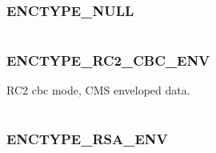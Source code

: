 \documentclass[letterpaper,10pt,english]{sphinxmanual}
\begin{document}
\subsubsection{ENCTYPE\_NULL}
\label{appdev/refs/macros/ENCTYPE_NULL:enctype-null}\label{appdev/refs/macros/ENCTYPE_NULL::doc}\label{appdev/refs/macros/ENCTYPE_NULL:enctype-null-data}

\begin{fulllineitems}
\label{appdev/refs/macros/ENCTYPE_NULL:ENCTYPE_NULL}
\end{fulllineitems}


\begin{tabulary}{\linewidth}{|L|L|}
\hline

 & 
\\\hline
\end{tabulary}



\subsubsection{ENCTYPE\_RC2\_CBC\_ENV}
\label{appdev/refs/macros/ENCTYPE_RC2_CBC_ENV:enctype-rc2-cbc-env}\label{appdev/refs/macros/ENCTYPE_RC2_CBC_ENV::doc}\label{appdev/refs/macros/ENCTYPE_RC2_CBC_ENV:enctype-rc2-cbc-env-data}

\begin{fulllineitems}
\label{appdev/refs/macros/ENCTYPE_RC2_CBC_ENV:ENCTYPE_RC2_CBC_ENV}
\end{fulllineitems}


RC2 cbc mode, CMS enveloped data.

\begin{tabulary}{\linewidth}{|L|L|}
\hline

 & 
\\\hline
\end{tabulary}



\subsubsection{ENCTYPE\_RSA\_ENV}
\label{appdev/refs/macros/ENCTYPE_RSA_ENV:enctype-rsa-env-data}\label{appdev/refs/macros/ENCTYPE_RSA_ENV:enctype-rsa-env}\label{appdev/refs/macros/ENCTYPE_RSA_ENV::doc}
\end{document}
